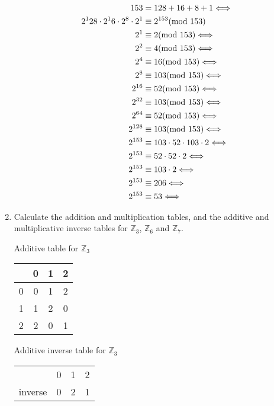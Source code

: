\documentclass[10pt,\jkfside,a4paper]{article}
\begin{document}
\begin{enumerate}
\begin{equation}
\begin{split}
153 &= 128 + 16 + 8 + 1\Longleftrightarrow\\
2^128 \cdot 2^16 \cdot 2^8 \cdot 2^1 &\equiv 2^{153}(\text{mod } 153)\\
\vspace{1em}
2^1 &\equiv 2(\text{mod } 153)\Longleftrightarrow\\
2^2 &\equiv 4(\text{mod } 153)\Longleftrightarrow\\
2^4 &\equiv 16(\text{mod } 153)\Longleftrightarrow\\
2^8 &\equiv 103(\text{mod } 153)\Longleftrightarrow\\
2^{16} &\equiv 52(\text{mod } 153)\Longleftrightarrow\\
2^{32} &\equiv 103(\text{mod } 153)\Longleftrightarrow\\
2^{64} &\equiv 52(\text{mod } 153)\Longleftrightarrow\\
2^{128} &\equiv 103(\text{mod } 153)\Longleftrightarrow\\
\vspace{1em}
2^{153}&\equiv 103\cdot 52 \cdot 103 \cdot 2\Longleftrightarrow\\
2^{153}&\equiv 52 \cdot 52 \cdot 2\Longleftrightarrow\\
2^{153}&\equiv 103 \cdot 2\Longleftrightarrow\\
2^{153}&\equiv 206 \Longleftrightarrow\\
2^{153}&\equiv 53 \Longleftrightarrow\\
\end{split}
\end{equation}

\item Calculate the addition and multiplication tables, and the additive and multiplicative inverse tables for 
$\mathbb{Z}_3$, $\mathbb{Z}_6$ and $\mathbb{Z}_7$.

Additive table for $\mathbb{Z}_3$
\begin{tabular}{c|c c c}
& 0 & 1 & 2\\
\hline
0 & 0 & 1 & 2\\
1 & 1 & 2 & 0\\
2 & 2 & 0 & 1\\
\end{tabular}

Additive inverse table for $\mathbb{Z}_3$
\begin{tabular}{c|c c c}
 & 0 & 1 & 2\\
inverse & 0 & 2 & 1\\
\end{tabular}


\end{enumerate}
\end{document}
